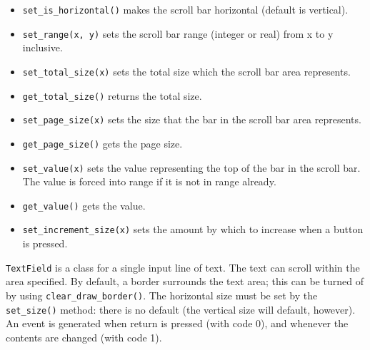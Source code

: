 \begin{itemize}
\item\noindent\texttt{set\_is\_horizontal()} makes the scroll bar horizontal (default is
vertical).

\item\noindent\texttt{set\_range(x, y)} sets the scroll bar range (integer or real)
from x to y inclusive.

\item\noindent\texttt{set\_total\_size(x)} sets the total size which the scroll bar area
represents.

\item\noindent\texttt{get\_total\_size()} returns the total size.

\item\noindent\texttt{set\_page\_size(x)} sets the size that the bar in the scroll bar area
represents.

\item\noindent\texttt{get\_page\_size()} gets the page size.

\item\noindent\texttt{set\_value(x)} sets the value representing the top of the bar in the
scroll bar. The value is forced into range if it is not in range
already.

\item\noindent\texttt{get\_value()} gets the value.

\item\noindent\texttt{set\_increment\_size(x)} sets the amount by which to increase when a
button is pressed.
\end{itemize}

\medskip{}

 \texttt{TextField} is a class for a single input line of text. The text can
scroll within the area specified. By default, a border surrounds the
text area; this can be turned of by using \texttt{clear\_draw\_border()}. The
horizontal size must be set by the \texttt{set\_size()} method: there is no
default (the vertical size will default, however). An event is
generated when return is pressed (with code 0), and whenever the
contents are changed (with code 1).

